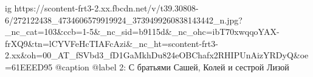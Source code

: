  
 
 
 
 

\ifcmt
  ig https://scontent-frt3-2.xx.fbcdn.net/v/t39.30808-6/272122438_4734606579919924_3739499260838143442_n.jpg?_nc_cat=103&ccb=1-5&_nc_sid=b9115d&_nc_ohc=ibT70xwqqoYAX-frXQ9&tn=lCYVFeHcTIAFcAzi&_nc_ht=scontent-frt3-2.xx&oh=00_AT_fSVbd3_fD1GaMkhDu824eOBChafx2RHIPUnAizYRDyQ&oe=61EEED95
  @caption @label 2: С братьями Сашей, Колей и сестрой Лизой
\fi
